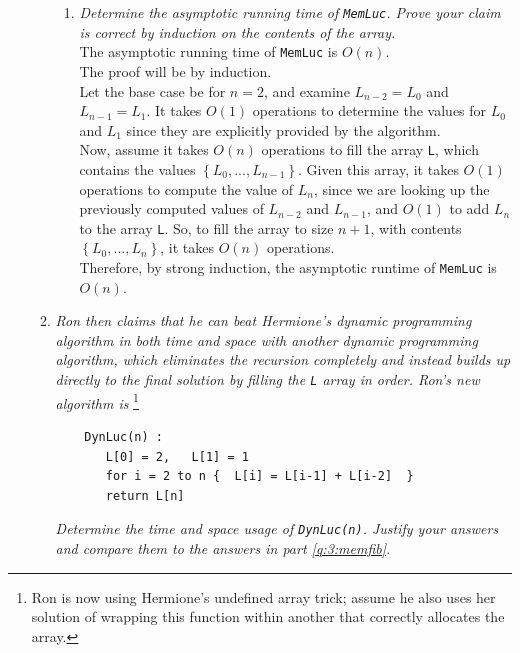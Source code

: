\documentclass[12pt]{article}
\begin{document}
\begin{enumerate}
\begin{enumerate}
\begin{enumerate}
	\item \textit{Determine the asymptotic running time of {\tt MemLuc}. Prove your claim is correct by induction on the contents of the array.}\\
	
	The asymptotic running time of {\tt MemLuc} is $O(n)$.\\
	
	The proof will be by induction.\\
	
	Let the base case be for $n=2$, and examine $L_{n-2} = L_0$ and $L_{n-1} = L_1$. It takes $O(1)$ operations to determine the values for $L_0$ and $L_1$ since they are explicitly provided by the algorithm.\\
	
	Now, assume it takes $O(n)$ operations to fill the array {\tt L}, which contains the values $\left\{L_0,...,L_{n-1}\right\}$. Given this array, it takes $O(1)$ operations to compute the value of $L_n$, since we are looking 
up the previously computed values of $L_{n-2}$ and $L_{n-1}$, and $O(1)$ to add $L_n$ to the array {\tt L}. So, to fill the array to size $n+1$, with contents $\left\{L_0,...,L_n\right\}$, it takes $O(n)$ operations.\\
	
	Therefore, by strong induction, the asymptotic runtime of {\tt MemLuc} is $\boxed{O(n)}$.
	
	\end{enumerate}
	
	\newpage
	\item \textit{Ron then claims that he can beat Hermione's dynamic programming algorithm in both time and space with another dynamic programming algorithm, which eliminates the recursion completely and instead builds up 
directly to the final solution by filling the {\tt L} array in order. Ron's new algorithm is }\footnote{Ron is now using Hermione's undefined array trick; assume he also uses her solution of wrapping this function within another 
that correctly allocates the array.}

	\begin{small}
	\begin{verbatim}
	DynLuc(n) :
	   L[0] = 2,   L[1] = 1
	   for i = 2 to n {  L[i] = L[i-1] + L[i-2]  }
	   return L[n]
	\end{verbatim}
	\end{small}

	\textit{Determine the time and space usage of {\tt DynLuc(n)}. Justify your answers and compare them to the answers in part \eqref{q:3:memfib}.}\\
	

\end{enumerate}
\end{enumerate}
\end{document}
